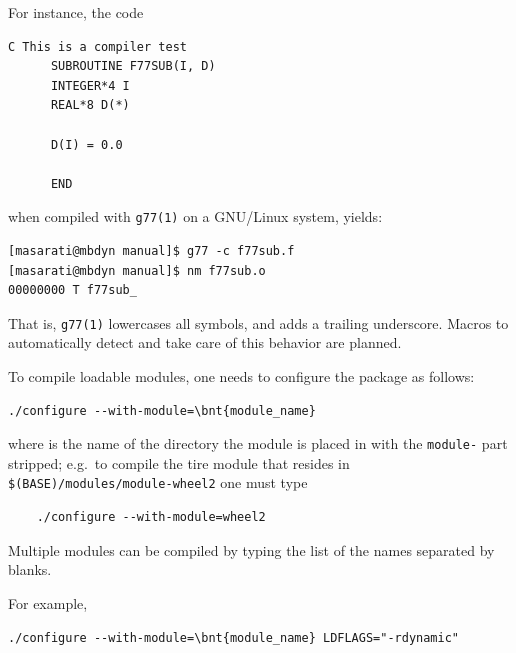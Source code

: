 \noindent
For instance, the code
\begin{verbatim}
C This is a compiler test
      SUBROUTINE F77SUB(I, D)
      INTEGER*4 I
      REAL*8 D(*)

      D(I) = 0.0

      END
\end{verbatim}
when compiled with \texttt{g77(1)} on a GNU/Linux system, yields:
\begin{verbatim}
[masarati@mbdyn manual]$ g77 -c f77sub.f
[masarati@mbdyn manual]$ nm f77sub.o
00000000 T f77sub_
\end{verbatim}
That is, \texttt{g77(1)} lowercases all symbols, and adds a trailing 
underscore.
Macros to automatically detect and take care of this behavior 
are planned.


\noindent
To compile loadable modules, one needs to configure
the package as follows:
\begin{Verbatim}[commandchars=\\\{\}]
    ./configure --with-module=\bnt{module_name}
\end{Verbatim}
where  is the name of the directory the module
is placed in with the \texttt{module-} part stripped; e.g.\ to compile
the tire module that resides in \texttt{\$(BASE)/modules/module-wheel2} 
one must type
\begin{verbatim}
    ./configure --with-module=wheel2
\end{verbatim}
Multiple modules can be compiled by typing the list of the names
separated by blanks.

\bigskip

\noindent
{}

\bigskip

For example,
\begin{Verbatim}[commandchars=\\\{\}]
    ./configure --with-module=\bnt{module_name} LDFLAGS="-rdynamic" 
\end{Verbatim}





